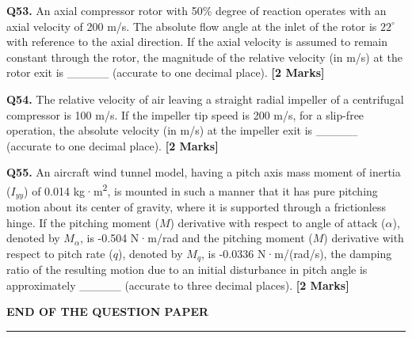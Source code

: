 \documentclass[11pt]{article}
\newcommand{\questionb}[2]{
    \noindent\textbf{Q#2.} #1 \hfill \textbf{[2 Marks]}
}
\begin{document}
\vspace{0.5cm}

\questionb{An axial compressor rotor with 50\% degree of reaction operates with an axial velocity of 200 m/s. The absolute flow angle at the inlet of the rotor is $22^\circ$ with reference to the axial direction. If the axial velocity is assumed to remain constant through the rotor, the magnitude of the relative velocity (in m/s) at the rotor exit is \_\_\_\_\_ (accurate to one decimal place).}{53}

\vspace{0.5cm}

\questionb{The relative velocity of air leaving a straight radial impeller of a centrifugal compressor is 100 m/s. If the impeller tip speed is 200 m/s, for a slip-free operation, the absolute velocity (in m/s) at the impeller exit is \_\_\_\_\_ (accurate to one decimal place).}{54}

\vspace{0.5cm}

\questionb{An aircraft wind tunnel model, having a pitch axis mass moment of inertia ($I_{yy}$) of 0.014 kg·m\textsuperscript{2}, is mounted in such a manner that it has pure pitching motion about its center of gravity, where it is supported through a frictionless hinge. If the pitching moment ($M$) derivative with respect to angle of attack ($\alpha$), denoted by $M_\alpha$, is -0.504 N·m/rad and the pitching moment ($M$) derivative with respect to pitch rate ($q$), denoted by $M_q$, is -0.0336 N·m/(rad/s), the damping ratio of the resulting motion due to an initial disturbance in pitch angle is approximately \_\_\_\_\_ (accurate to three decimal places).}{55}

\vspace{0.5cm}




\vspace{5cm}
\begin{center}
\textbf{END OF THE QUESTION PAPER}
\rule{\textwidth}{0.5pt} 
\end{center}
\end{document}
